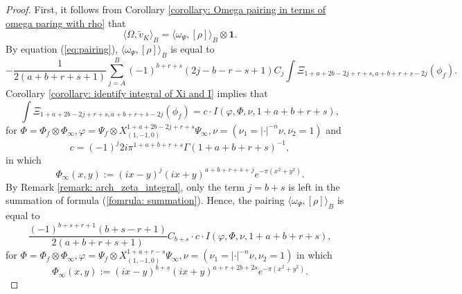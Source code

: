 \documentclass[11pt, a4paper]{amsart}
\theoremstyle{plain}
\theoremstyle{definition}
\numberwithin{equation}{section}
\begin{document}
\begin{proof}
    \par First, it follows from Corollary \ref{corollary: Omega pairing in terms of omega paring with rho} that 
    \begin{equation*}
         \langle \Omega, \tilde{v}_{K} \rangle_{B} = \langle \omega_{\Psi}, [\rho] \rangle_{B} \otimes \mathbf{1}. 
    \end{equation*}
    By equation (\ref{eq:pairing}), $\langle \omega_{\Psi}, [\rho] \rangle_{B}$ is equal to 
    \begin{equation}
    \label{fomrula: summation}
         -\frac{1}{2(a + b + r + s + 1)} \sum\limits_{j = A}^{B} (-1)^{b + r + s} (2j - b -r - s + 1) C_j\int \Xi_{1 + a + 2b - 2j + r + s, a + b + r + s - 2j}(\phi_f).
    \end{equation}
     Corollary \ref{corollary: identify integral of Xi and I} implies that 
    \begin{equation*}
     \int \Xi_{1 + a + 2b - 2j + r + s, a + b + r + s - 2j}(\phi_f) =  c \cdot I(\varphi, \Phi, \nu, 1 + a + b + r + s), 
    \end{equation*}
    for $\Phi = \Phi_f \otimes \Phi_{\infty}, \varphi = \Psi_{f} \otimes X^{1 + a + 2b - 2j + r + s}_{(1, -1, 0)}{\Psi}_{\infty}, \nu = (\nu_1 = |\cdot|^{-n} \nu, \nu_2 = 1)$ and 
    \begin{equation}
    \label{eq: chap10 formula for c}
        c = (-1)^{j} 2i \pi^{1 +a + b + r + s} \Gamma(1 + a + b + r + s)^{-1}, 
    \end{equation}
    in which 
    \begin{equation*}
        \Phi_{\infty}(x, y) := (ix - y)^{j}(ix + y)^{a + b + r + s + j} e^{-\pi(x^2 + y^2)}. 
    \end{equation*}
    By Remark \ref{remark: arch_zeta_integral}, only the term $j = b + s$ is left in the summation of formula (\ref{fomrula: summation}). Hence, the pairing $\langle \omega_{\Psi}, [\rho] \rangle_{B}$ is equal to
    \begin{equation*}
        \frac{(-1)^{b + s + r + 1}(b + s - r + 1)}{2(a + b + r + s + 1)} C_{b + s} \cdot c \cdot I(\varphi, \Phi, \nu, 1 + a + b + r + s),
    \end{equation*}
    for $\Phi = \Phi_f \otimes \Phi_{\infty}, \varphi = \Psi_{f} \otimes X^{1 + a + r - s}_{(1, -1, 0)}{\Psi}_{\infty}, \nu = (\nu_1 = |\cdot|^{-n} \nu, \nu_2 = 1)$ 
    in which 
    \begin{equation*}
        \Phi_{\infty}(x, y) := (ix - y)^{b + s}(ix + y)^{a + r + 2b + 2s} e^{-\pi(x^2 + y^2)}. 
    \end{equation*}


\end{proof}
\end{document}
